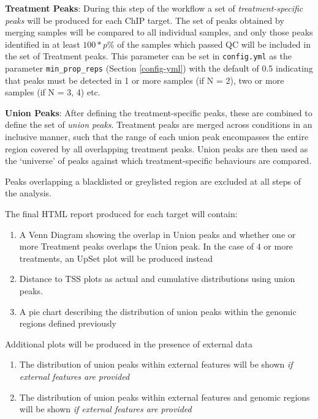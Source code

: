 \documentclass[
]{book}
\providecommand{\tightlist}{%
  \setlength{\itemsep}{0pt}\setlength{\parskip}{0pt}}
\begin{document}
\textbf{Treatment Peaks}: During this step of the workflow a set of \emph{treatment-specific peaks} will be produced for each ChIP target.
The set of peaks obtained by merging samples will be compared to all individual samples, and only those peaks identified in at least \(100*p\%\) of the samples which passed QC will be included in the set of Treatment peaks.
This parameter can be set in \texttt{config.yml} as the parameter \texttt{min\_prop\_reps} (Section \ref{config-yml}) with the default of 0.5 indicating that peaks must be detected in 1 or more samples (if N = 2), two or more samples (if N = 3, 4) etc.

\textbf{Union Peaks}: After defining the treatment-specific peaks, these are combined to define the set of \emph{union peaks}.
Treatment peaks are merged across conditions in an inclusive manner, such that the range of each union peak encompasses the entire region covered by all overlapping treatment peaks.
Union peaks are then used as the `universe' of peaks against which treatment-specific behaviours are compared.

Peaks overlapping a blacklisted or greylisted region are excluded at all steps of the analysis.

The final HTML report produced for each target will contain:

\begin{enumerate}
\def\labelenumi{\arabic{enumi}.}
\tightlist
\item
  A Venn Diagram showing the overlap in Union peaks and whether one or more Treatment peaks overlaps the Union peak. In the case of 4 or more treatments, an UpSet plot will be produced instead
\item
  Distance to TSS plots as actual and cumulative distributions using union peaks.
\item
  A pie chart describing the distribution of union peaks within the genomic regions defined previously
\end{enumerate}

Additional plots will be produced in the presence of external data

\begin{enumerate}
\def\labelenumi{\arabic{enumi}.}
\tightlist
\item
  The distribution of union peaks within external features will be shown \emph{if external features are provided}
\item
  The distribution of union peaks within external features and genomic regions will be shown \emph{if external features are provided}
\end{enumerate}
\end{document}
